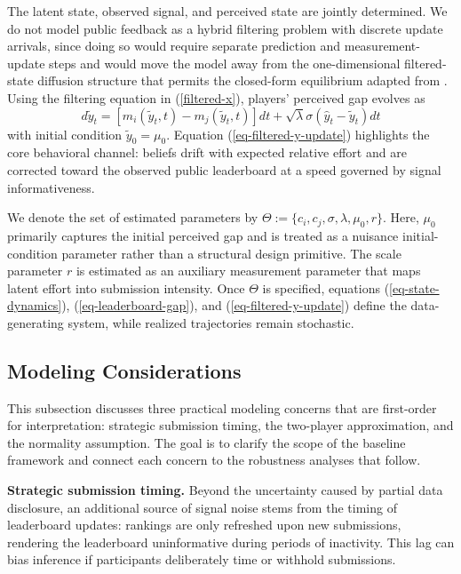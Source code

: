\documentclass[mnsc]{informs3}
\begin{document}
The latent state, observed signal, and perceived state are jointly determined.
We do not model public feedback as a hybrid filtering problem with discrete update arrivals, since doing so would require separate prediction and measurement-update steps and would move the model away from the one-dimensional filtered-state diffusion structure that permits the closed-form equilibrium adapted from \citet{Ryvkin2022Fight}.
Using the filtering equation in (\ref{filtered-x}), players’ perceived gap evolves as
\begin{equation}\label{eq-filtered-y-update}
d\tilde{y}_{t} = \left[m_i(\tilde{y}_t, t) - m_j(\tilde{y}_t, t)\right]dt + \sqrt{\lambda}\sigma(\hat{y}_t-\tilde{y}_{t}) dt
\end{equation}
with initial condition $\tilde{y}_0 = \mu_0$.
Equation (\ref{eq-filtered-y-update}) highlights the core behavioral channel: beliefs drift with expected relative effort and are corrected toward the observed public leaderboard at a speed governed by signal informativeness.

We denote the set of estimated parameters by $\Theta := \{c_i, c_j, \sigma, \lambda, \mu_0,r\}$.
Here, $\mu_0$ primarily captures the initial perceived gap and is treated as a nuisance initial-condition parameter rather than a structural design primitive.
The scale parameter $r$ is estimated as an auxiliary measurement parameter that maps latent effort into submission intensity.
Once $\Theta$ is specified, equations (\ref{eq-state-dynamics}), (\ref{eq-leaderboard-gap}), and (\ref{eq-filtered-y-update}) define the data-generating system, while realized trajectories remain stochastic.



\subsection{Modeling Considerations}\label{sect-concerns}

This subsection discusses three practical modeling concerns that are first-order for interpretation: strategic submission timing, the two-player approximation, and the normality assumption.
The goal is to clarify the scope of the baseline framework and connect each concern to the robustness analyses that follow.

\textbf{Strategic submission timing.}
Beyond the uncertainty caused by partial data disclosure, an additional source of signal noise stems from the timing of leaderboard updates: rankings are only refreshed upon new submissions, rendering the leaderboard uninformative during periods of inactivity.
This lag can bias inference if participants deliberately time or withhold submissions.
\end{document}
